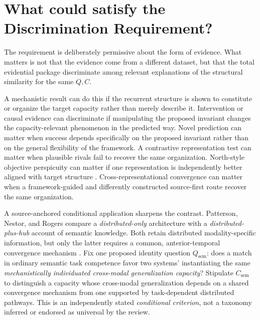 \documentclass[11pt]{article}
\begin{document}
\section{What could satisfy the Discrimination Requirement?}

The requirement is deliberately permissive about the form of evidence. What matters is not that the evidence come from a different dataset, but that the total evidential package discriminate among relevant explanations of the structural similarity for the same \(Q,C\).

A mechanistic result can do this if the recurrent structure is shown to constitute or organize the target capacity rather than merely describe it. Intervention or causal evidence can discriminate if manipulating the proposed invariant changes the capacity-relevant phenomenon in the predicted way. Novel prediction can matter when success depends specifically on the proposed invariant rather than on the general flexibility of the framework. A contrastive representation test can matter when plausible rivals fail to recover the same organization. North-style objective perspicuity can matter if one representation is independently better aligned with target structure \citep{North2026Perspicuous}. Cross-representational convergence can matter when a framework-guided and differently constructed source-first route recover the same organization.

A source-anchored conditional application sharpens the contrast. Patterson, Nestor, and Rogers compare a \emph{distributed-only} architecture with a \emph{distributed-plus-hub} account of semantic knowledge. Both retain distributed modality-specific information, but only the latter requires a common, anterior-temporal convergence mechanism \citep[Fig.~1]{PattersonNestorRogers2007Semantic}. Fix one proposed identity question \(Q_{\mathrm{sem}}\): does a match in ordinary semantic task competence favor two systems' instantiating the same \emph{mechanistically individuated cross-modal generalization capacity}? Stipulate \(C_{\mathrm{sem}}\) to distinguish a capacity whose cross-modal generalization depends on a shared convergence mechanism from one supported by task-dependent distributed pathways. This is an independently stated \emph{conditional criterion}, not a taxonomy inferred or endorsed as universal by the review.
\end{document}
